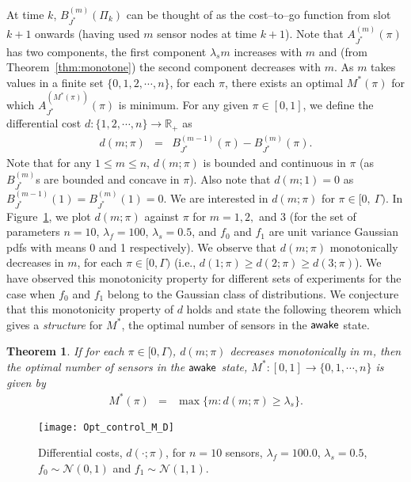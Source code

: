 \documentclass[journal]{IEEEtran}
\newtheorem{theorem}{Theorem}
\newcommand{\wake}{{${\sf awake }$}}
\begin{document}
At time $k$, $B_{J^*}^{(m)}(\Pi_k)$ can be thought of as the cost--to--go 
function from slot $k+1$ onwards (having used $m$ sensor nodes at time
$k+1$). Note
that $A_{J^*}^{(m)}(\pi)$ has two components, the first component
$\lambda_s m$ increases with $m$ and (from 
Theorem~\ref{thm:monotone}) the second component decreases with $m$.
As $m$ takes values in a finite set $\{0,1,2,\cdots,n\}$, for each $\pi$, there exists an optimal $M^*(\pi)$ for which
$A_{J^*}^{(M^*(\pi))}(\pi)$ is minimum. 
For any given $\pi \in [0,1]$, we define the differential cost  
$d:\{1,2,\cdots,n\} \to \mathbb{R}_+$ as 
\begin{eqnarray}
\label{eqn:differential_cost_function}
d(m;\pi) & = & B_{J^*}^{(m-1)}(\pi) - B_{J^*}^{(m)}(\pi). 
\end{eqnarray}
Note that for any $1 \le m \le n$, $d(m;\pi)$ is bounded and continuous
in $\pi$ (as $B_{J^*}^{(m)}$s are bounded and concave in $\pi$). Also
note that $d(m;1) = 0$ as $B_{J^*}^{(m-1)}(1) = B_{J^*}^{(m)}(1) = 0$. We are interested
in  $d(m;\pi)$ for $\pi \in [0, \ \Gamma)$.
In Figure~\ref{fig:Opt_control_M_D}, we plot 
$d(m;\pi)$ against $\pi$ for $m=1,2,$ and 3 (for the set of parameters 
$n = 10$, $\lambda_f = 100$, $\lambda_s = 0.5$, and $f_0$ and $f_1$ are unit variance Gaussian 
pdfs with means 0 and 1 respectively). We observe that 
$d(m;\pi)$ monotonically decreases in $m$, for each $\pi \in [0,\Gamma)$
(i.e., $d(1;\pi) \ge d(2;\pi) \ge d(3;\pi)$).
We have observed this monotonicity property for different sets of experiments for the 
case when $f_0$ and $f_1$ belong to the Gaussian class of distributions. 
We conjecture that this monotonicity property of $d$ holds and state the following theorem
which gives a {\em structure} for $M^*$, the optimal number of sensors in the {\wake}
state.  
\begin{theorem}
\label{thm:label1}
If for each $\pi \in [0,\Gamma)$, $d(m;\pi)$ decreases monotonically in 
$m$, then the optimal number of sensors in the {\wake} state, 
$M^*:[0,1]\rightarrow \{0,1,\cdots,n\}$ is given by
\begin{eqnarray*}
M^*(\pi) & = & \max \big\{m: d(m;\pi) \ge \lambda_s\big\}.
\end{eqnarray*}
\end{theorem}
\begin{figure}
\centering
\texttt{[image: Opt\_control\_M\_D]}
\caption{Differential costs, $d(\cdot;\pi)$, for $n = 10$ sensors, $\lambda_f = 100.0$, $\lambda_s = 0.5$, $f_0 \sim \mathcal{N}(0,1)$ and $f_1 \sim \mathcal{N}(1,1)$.}
\label{fig:Opt_control_M_D}
\end{figure}
\end{document}
